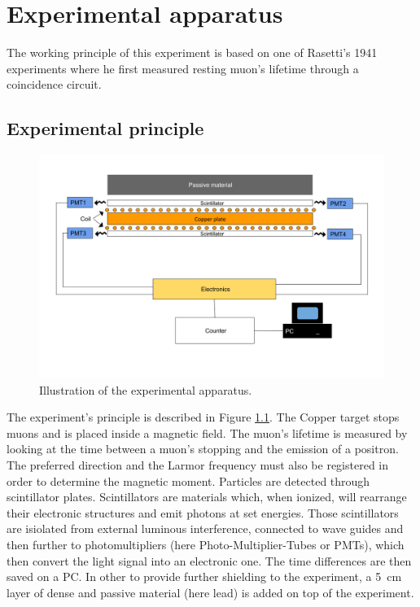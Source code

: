 \chapter{Experimental apparatus}

The working principle of this experiment is based on one of Rasetti's 1941 experiments where he first measured resting muon's lifetime through a coincidence circuit.

\section{Experimental principle}

\begin{figure}[htbp]
\centering
\includegraphics[width=\linewidth]{./fig/principle.png}
\caption{Illustration of the experimental apparatus.}
\label{fig:principle}
\end{figure}

The experiment's principle is described in Figure \ref{fig:principle}. The Copper target stops muons and is placed inside a magnetic field. The muon's lifetime is measured by looking at the time between a muon's stopping and the emission of a positron. The preferred direction and the Larmor frequency must also be registered in order to determine the magnetic moment. Particles are detected through scintillator plates. Scintillators are materials which, when ionized, will rearrange their electronic structures and emit photons at set energies. Those scintillators are isiolated from external luminous interference, connected to wave guides and then further to photomultipliers (here Photo-Multiplier-Tubes or PMTs), which then convert the light signal into an electronic one. The time differences are then saved on a PC. In other to provide further shielding to the experiment, a \SI{5}{\centi\meter} layer of dense and passive material (here lead) is added on top of the experiment.

